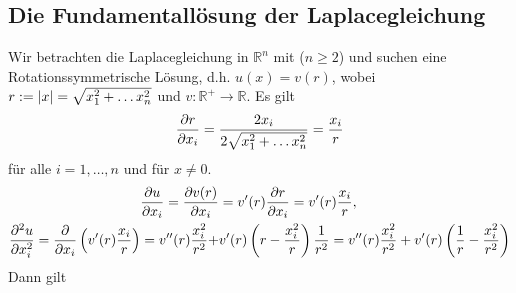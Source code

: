 \subsection{Die Fundamentallösung der Laplacegleichung} 
\label{sub:die_fundamentallosung_der_laplacegleichung}
Wir betrachten die Laplacegleichung in $\mathbb{R}^n$ mit ($n \geq 2$) und suchen eine Rotationssymmetrische Lösung, d.h. $u(x) = v(r)$, wobei $r := \lvert x\rvert= \sqrt{x_1^2 + \dots x_n^2}$ und $v : \mathbb{R}^+ \to \mathbb{R}$. Es gilt
\begin{equation}
	\frac{{\partial r}}{{\partial x_i}}  = \frac{2x_i}{2\sqrt{x_1^2 + \dots x_n^2} } = \frac{x_i}{r}
\end{equation}
für alle $i=1,\dots,n$ und für $x \neq 0$.
\begin{align}
	\frac{{\partial u}}{{\partial x_i}}  = \frac{{\partial v(r)}}{{\partial x_i}}  &= v'(r) \frac{{\partial r}}{{\partial x_i}}  = v'(r) \frac{x_i}{r}, \\
	\frac{{\partial ^2u}}{{\partial x_i^2}}  = \frac{{\partial }}{{\partial x_i}}  \left( v'(r) \frac{x_i}{r} \right) = v''(r) \frac{x_i^2}{r^2} + &v'(r) \left( r - \frac{x_i^2}{r} \right) \frac{1}{r^2} = v''(r) \frac{x_i^2}{r^2} + v'(r) \left( \frac{1}{r} - \frac{x_i^2}{r^2} \right)
\end{align}
Dann gilt


